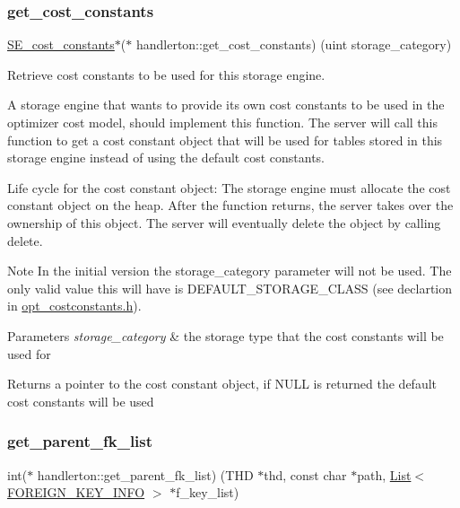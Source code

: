 \subsubsection{\texorpdfstring{get\+\_\+cost\+\_\+constants}{get\_cost\_constants}}
{\footnotesize\ttfamily \mbox{\hyperlink{classSE__cost__constants}{S\+E\+\_\+cost\+\_\+constants}}$\ast$($\ast$ handlerton\+::get\+\_\+cost\+\_\+constants) (uint storage\+\_\+category)}

Retrieve cost constants to be used for this storage engine.

A storage engine that wants to provide its own cost constants to be used in the optimizer cost model, should implement this function. The server will call this function to get a cost constant object that will be used for tables stored in this storage engine instead of using the default cost constants.

Life cycle for the cost constant object\+: The storage engine must allocate the cost constant object on the heap. After the function returns, the server takes over the ownership of this object. The server will eventually delete the object by calling delete.

\begin{DoxyNote}{Note}
In the initial version the storage\+\_\+category parameter will not be used. The only valid value this will have is D\+E\+F\+A\+U\+L\+T\+\_\+\+S\+T\+O\+R\+A\+G\+E\+\_\+\+C\+L\+A\+SS (see declartion in \mbox{\hyperlink{opt__costconstants_8h_source}{opt\+\_\+costconstants.\+h}}).
\end{DoxyNote}

\begin{DoxyParams}{Parameters}
{\em storage\+\_\+category} & the storage type that the cost constants will be used for\\
\hline
\end{DoxyParams}
\begin{DoxyReturn}{Returns}
a pointer to the cost constant object, if N\+U\+LL is returned the default cost constants will be used 
\end{DoxyReturn}
\mbox{\label{structhandlerton_af5efe2d0a29eb581b591e1d12ea09ff4}} 
\subsubsection{\texorpdfstring{get\+\_\+parent\+\_\+fk\+\_\+list}{get\_parent\_fk\_list}}
{\footnotesize\ttfamily int($\ast$ handlerton\+::get\+\_\+parent\+\_\+fk\+\_\+list) (T\+HD $\ast$thd, const char $\ast$path, \mbox{\hyperlink{classList}{List}}$<$ \mbox{\hyperlink{structst__foreign__key__info}{F\+O\+R\+E\+I\+G\+N\+\_\+\+K\+E\+Y\+\_\+\+I\+N\+FO}} $>$ $\ast$f\+\_\+key\+\_\+list)}

